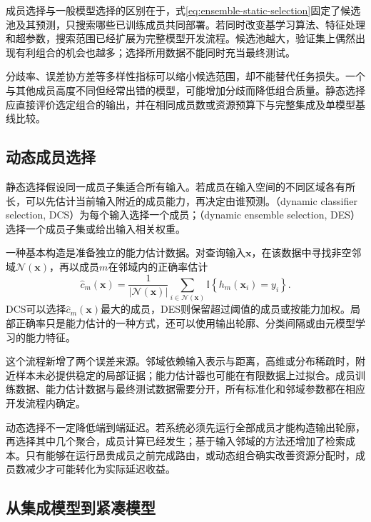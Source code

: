 成员选择与一般模型选择的区别在于，式\eqref{eq:ensemble-static-selection}固定了候选池及其预测，只搜索哪些已训练成员共同部署。若同时改变基学习算法、特征处理和超参数，搜索范围已经扩展为完整模型开发流程。候选池越大，验证集上偶然出现有利组合的机会也越多；选择所用数据不能同时充当最终测试。

分歧率、误差协方差等多样性指标可以缩小候选范围，却不能替代任务损失。一个与其他成员高度不同但经常出错的模型，可能增加分歧而降低组合质量。静态选择应直接评价选定组合的输出，并在相同成员数或资源预算下与完整集成及单模型基线比较。

\subsection{动态成员选择}
\label{sec:ensemble-dynamic-selection}

静态选择假设同一成员子集适合所有输入。若成员在输入空间的不同区域各有所长，可以先估计当前输入附近的成员能力，再决定由谁预测。（dynamic classifier selection, DCS）为每个输入选择一个成员；（dynamic ensemble selection, DES）选择一个成员子集或给出输入相关权重。

一种基本构造是准备独立的能力估计数据。对查询输入$\bm{x}$，在该数据中寻找非空邻域$\mathcal{N}(\bm{x})$，再以成员$m$在邻域内的正确率估计
\begin{equation}
  \widehat{c}_m(\bm{x})
  =
  \frac{1}{|\mathcal{N}(\bm{x})|}
  \sum_{i\in\mathcal{N}(\bm{x})}
  \mathbb{I}\!\left\{h_m(\bm{x}_i)=y_i\right\}.
  \label{eq:ensemble-local-competence}
\end{equation}
DCS可以选择$\widehat{c}_m(\bm{x})$最大的成员，DES则保留超过阈值的成员或按能力加权。局部正确率只是能力估计的一种方式，还可以使用输出轮廓、分类间隔或由元模型学习的能力特征。

这个流程新增了两个误差来源。邻域依赖输入表示与距离，高维或分布稀疏时，附近样本未必提供稳定的局部证据；能力估计器也可能在有限数据上过拟合。成员训练数据、能力估计数据与最终测试数据需要分开，所有标准化和邻域参数都在相应开发流程内确定。

动态选择不一定降低端到端延迟。若系统必须先运行全部成员才能构造输出轮廓，再选择其中几个聚合，成员计算已经发生；基于输入邻域的方法还增加了检索成本。只有能够在运行昂贵成员之前完成路由，或动态组合确实改善资源分配时，成员数减少才可能转化为实际延迟收益。

\subsection{从集成模型到紧凑模型}
\label{sec:ensemble-compression}

